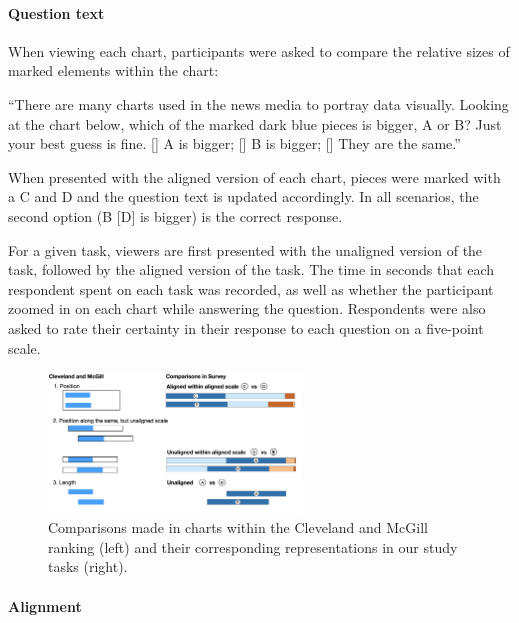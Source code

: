 \documentclass[
]{jds}
\let\oldparagraph\paragraph
\renewcommand{\paragraph}[1]{\oldparagraph{#1}\mbox{}}
\begin{document}
\hypertarget{question-text}{%
\paragraph{Question text}\label{question-text}}

When viewing each chart, participants were asked to compare the relative
sizes of marked elements within the chart:

``There are many charts used in the news media to portray data visually.
Looking at the chart below, which of the marked dark blue pieces is
bigger, A or B? Just your best guess is fine. {[}{]} A is bigger; {[}{]}
B is bigger; {[}{]} They are the same.''

When presented with the aligned version of each chart, pieces were
marked with a C and D and the question text is updated accordingly. In
all scenarios, the second option (B {[}D{]} is bigger) is the correct
response.

For a given task, viewers are first presented with the unaligned version
of the task, followed by the aligned version of the task. The time in
seconds that each respondent spent on each task was recorded, as well as
whether the participant zoomed in on each chart while answering the
question. Respondents were also asked to rate their certainty in their
response to each question on a five-point scale.

\begin{figure}[hbt]

{\centering \includegraphics[width=0.6\textwidth,height=\textheight]{images/sketch-tasks.png}

}

\caption{\label{fig-tasks-explain}Comparisons made in charts within the
Cleveland and McGill ranking (left) and their corresponding
representations in our study tasks (right).}

\end{figure}

\hypertarget{alignment}{%
\paragraph{Alignment}\label{alignment}}
\end{document}
